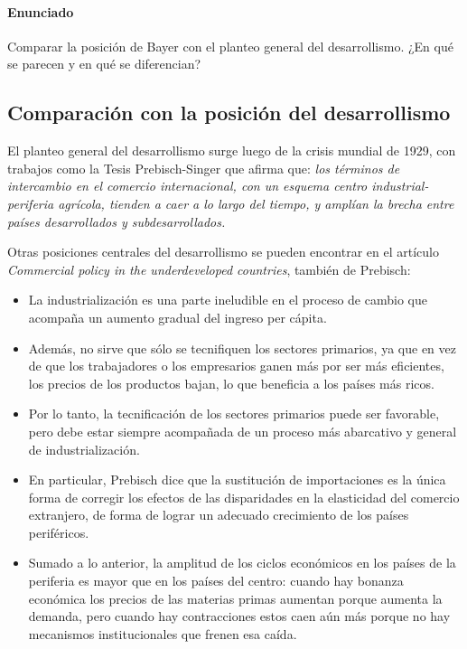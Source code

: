 \paragraph{Enunciado}
 Comparar la posición de Bayer con el planteo general del desarrollismo. ¿En qué se parecen y en qué se diferencian?

 \subsection{Comparación con la posición del desarrollismo}

 El planteo general del desarrollismo surge luego de la crisis mundial de 1929, con trabajos como la Tesis Prebisch-Singer que afirma que:
 \textit{los términos de intercambio en el comercio internacional, con un esquema centro industrial-periferia agrícola, tienden a caer a lo largo del tiempo,  y amplían la brecha entre países desarrollados y subdesarrollados.}


Otras posiciones centrales del desarrollismo se pueden encontrar en el artículo \textit{Commercial policy in the underdeveloped countries}, también de Prebisch:

 \begin{itemize}


    \item La industrialización es una parte ineludible en el proceso de cambio que acompaña un aumento gradual del ingreso per cápita.
    \item Además, no sirve que sólo se tecnifiquen los sectores primarios, ya que en vez de que los trabajadores o los empresarios ganen más por ser más eficientes, los precios de los productos bajan, lo que beneficia a los países más ricos.
    \item Por lo tanto, la tecnificación de los sectores primarios puede ser favorable, pero debe estar siempre acompañada de un proceso más abarcativo y general de industrialización.
    \item En particular, Prebisch dice que la sustitución de importaciones es la única forma de corregir los efectos de las disparidades en la elasticidad del comercio extranjero, de forma de lograr un adecuado crecimiento de los países periféricos.
    \item Sumado a lo anterior, la amplitud de los ciclos económicos en los países de la periferia es mayor que en los países del centro: cuando hay bonanza económica los precios de las materias primas aumentan porque aumenta la demanda, pero cuando hay contracciones estos caen aún más porque no hay mecanismos institucionales que frenen esa caída.
 \end{itemize}

